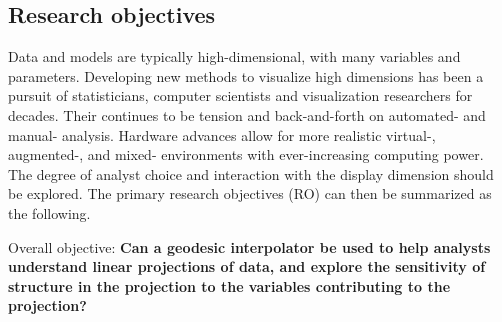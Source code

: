 \documentclass[
  11,
]{article}
\begin{document}
\hypertarget{research-objectives}{%
\subsection{Research objectives}\label{research-objectives}}

Data and models are typically high-dimensional, with many variables and parameters. Developing new methods to visualize high dimensions has been a pursuit of statisticians, computer scientists and visualization researchers for decades. Their continues to be tension and back-and-forth on automated- and manual- analysis. Hardware advances allow for more realistic virtual-, augmented-, and mixed- environments with ever-increasing computing power. The degree of analyst choice and interaction with the display dimension should be explored. The primary research objectives (RO) can then be summarized as the following.

Overall objective: \textbf{Can a geodesic interpolator be used to help analysts understand linear projections of data, and explore the sensitivity of structure in the projection to the variables contributing to the projection? }
\end{document}

